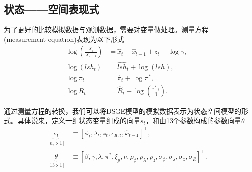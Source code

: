 \subsection{状态——空间表现式}
\label{sec:stylized-ssrep}
为了更好的比较模拟数据与观测数据，需要对变量做处理。测量方程(measurement equation)表现为以下形式
\begin{equation}
  \label{eq:stylized-ssrep-measurement-equations}
  \begin{split}
    \log \left( \frac{X_{t}}{X_{t-1}} \right) & = \hat{x}_{t} - \hat{x}_{t-1} + z_{t} + \log \gamma, \\
    \log \left( lsh_{t} \right) & = \widehat{lsh}_{t} + \log \left( lsh \right), \\
    \log \pi_{t} & = \hat{\pi}_{t} + \log \pi^{*}, \\
    \log R_{t} & = \hat{R}_{t} + \log \left( \frac{\pi^{*} \gamma }{\beta} \right).
  \end{split}
\end{equation}

通过测量方程的转换，我们可以将DSGE模型的模拟数据表示为状态空间模型的形式\cite[Ch. 6]{Shumway:2017ej}。具体说来，定义一组状态变量组成的向量$s_{t}$，和由13个参数构成的参数向量$\theta$
\begin{equation}
  \label{eq:stylized-ssrep-state-vector-def}
  \begin{split}
    \underbrace{
    s_{t}
    }_{\left[ n_{s} \times 1 \right]}
    & \equiv \left[
    \phi_{t}, \lambda_{t}, z_{t}, \epsilon_{R,t}, \hat{x}_{t-1}
    \right]^{\top}, \\
    \underbrace{
    \theta
    }_{\left[ 13 \times 1 \right]}
    & \equiv \left[
    \beta, \gamma, \lambda, \pi^{*}, \xi_{p}, \nu, \rho_{\phi}, \rho_{\lambda}, \rho_{z}, \sigma_{\phi}, \sigma_{\lambda}, \sigma_{z}, \sigma_{R}
    \right]^{\top}.
  \end{split}
\end{equation}

